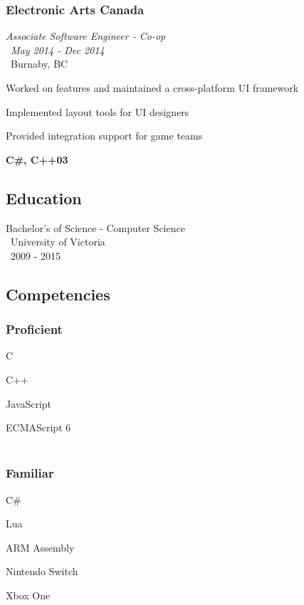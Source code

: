 \documentclass{article}
\begin{document}
\begin{multicols*}{2}
\subsubsection*{Electronic Arts Canada}
\textit{Associate Software Engineer - Co-op} \\\
\textit{May 2014 - Dec 2014} \\\
Burnaby, BC
\begin{compactitem}
  \item Worked on features and maintained a cross-platform UI framework
  \item Implemented layout tools for UI designers
  \item Provided integration support for game teams
  \item \textbf{C\#, C++03}
\end{compactitem}

\subsection*{Education}
Bachelor's of Science - Computer Science \\\
University of Victoria \\\
2009 - 2015

\subsection*{Competencies}
\begin{multicols*}{2}
\subsubsection*{Proficient}
\begin{compactitem}
\item C
\item C++
\item JavaScript
\item ECMAScript 6
\\\
\end{compactitem}

\subsubsection*{Familiar}
\begin{compactitem}
\item C\#
\item Lua
\item ARM Assembly
\item Nintendo Switch
\item Xbox One
\end{compactitem}


\end{multicols*}
\end{multicols*}
\end{document}
